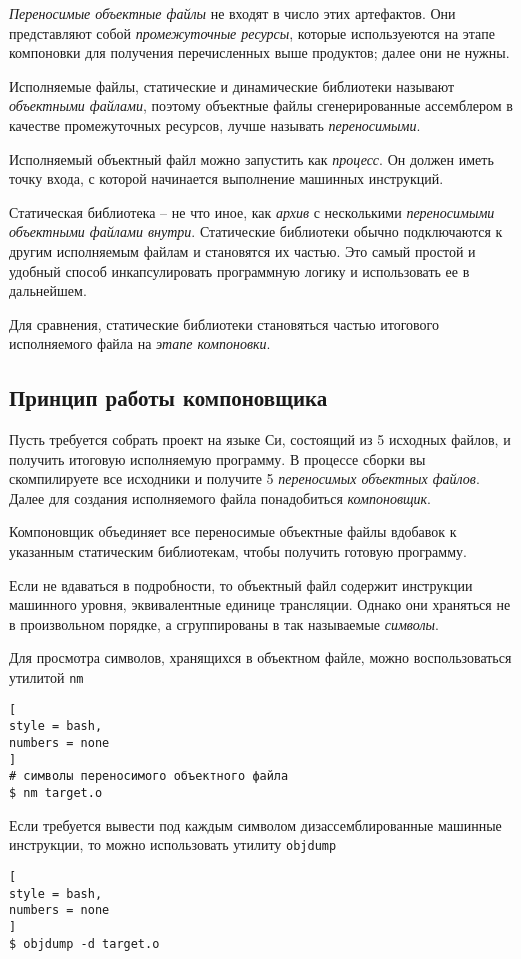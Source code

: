 \documentclass[%
	11pt,
	a4paper,
	utf8,
		]{article}
\begin{document}
\emph{Переносимые объектные файлы} не входят в число этих артефактов. Они представляют собой \emph{промежуточные ресурсы}, которые используеются на этапе компоновки для получения перечисленных выше продуктов; далее они не нужны.

Исполняемые файлы, статические и динамические библиотеки называют \emph{объектными файлами}, поэтому объектные файлы сгенерированные ассемблером в качестве промежуточных ресурсов, лучше называть \emph{переносимыми}.

Исполняемый объектный файл можно запустить как \emph{процесс}. Он должен иметь точку входа, с которой начинается выполнение машинных инструкций.

Статическая библиотека -- не что иное, как \emph{архив} с несколькими \emph{переносимыми объектными файлами внутри}. Статические библиотеки обычно подключаются к другим исполняемым файлам и становятся их частью. Это самый простой и удобный способ инкапсулировать программную логику и использовать ее в дальнейшем.

Для сравнения, статические библиотеки становяться частью итогового исполняемого файла на \emph{этапе компоновки}.

\subsection{Принцип работы компоновщика}

Пусть требуется собрать проект на языке Си, состоящий из 5 исходных файлов, и получить итоговую исполняемую программу. В процессе сборки вы скомпилируете все исходники и получите 5 \emph{переносимых объектных файлов}. Далее для создания исполняемого файла понадобиться \emph{компоновщик}.

Компоновщик объединяет все переносимые объектные файлы вдобавок к указанным статическим библиотекам, чтобы получить готовую программу.

Если не вдаваться в подробности, то объектный файл содержит инструкции машинного уровня, эквивалентные единице трансляции. Однако они храняться не в произвольном порядке, а сгруппированы в так называемые \emph{символы}.

Для просмотра символов, хранящихся в объектном файле, можно воспользоваться утилитой \verb|nm|
\begin{lstlisting}[
style = bash,
numbers = none
]
# символы переносимого объектного файла
$ nm target.o
\end{lstlisting}

Если требуется вывести под каждым символом дизассемблированные машинные инструкции, то можно использовать утилиту \verb|objdump|
\begin{lstlisting}[
style = bash,
numbers = none
]
$ objdump -d target.o
\end{lstlisting}
\end{document}
